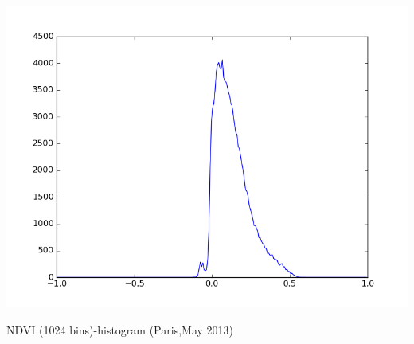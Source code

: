 \documentclass[c]{beamer}
\begin{document}
\begin{frame}
\begin{columns}
\begin{column}{0.33\textwidth}
  \begin{overlayarea}{\linewidth}{2cm}
  \centering\vfill
  \includegraphics[scale=0.12]{images/Paris/05_ndvi_histo.png}
  \end{overlayarea}
  \begin{overlayarea}{\linewidth}{0.5cm}
  \centering
  \tiny NDVI (1024 bins)-histogram (Paris,May 2013) \par
  \end{overlayarea}
 \end{column}
\end{columns}

\end{frame}
\end{document}
